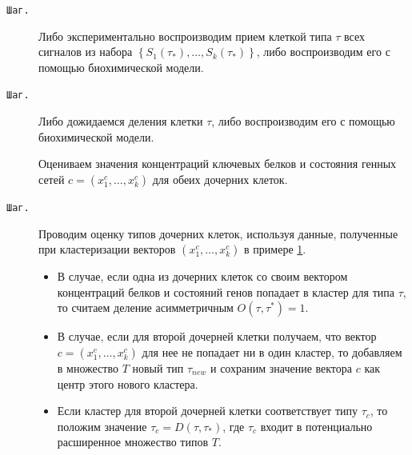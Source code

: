 \begin{description}





\item[\tt Шаг.\!\!]  Либо экспериментально воспроизводим прием клеткой типа $\tau$ всех сигналов из набора $\left\lbrace  S_{1}(\tau_{*}), \dots , S_{k}(\tau_{*}) \right\rbrace $, либо воспроизводим его с помощью биохимической модели.  



\item[\tt Шаг.\!\!]  Либо дожидаемся деления клетки $\tau$, либо воспроизводим его с помощью биохимической модели. 

Оцениваем значения концентраций ключевых белков и состояния генных сетей $c = (x^{c}_{1}, \dots ,x^{c}_{k})$ для обеих дочерних клеток. 



\item[\tt Шаг.\!\!]   Проводим оценку типов дочерних клеток, используя данные, полученные при кластеризации векторов $ (x^{c}_{1}, \dots ,x^{c}_{k})$ в примере \hyperlink{naz:ex:1}{1}.

\begin{itemize}

	\item В случае, если одна из дочерних клеток со своим вектором концентраций белков и состояний генов попадает в кластер для типа $\tau$, то считаем деление асимметричным $O(\tau,\tau^{*}) = 1$.

	\item В случае, если для второй дочерней клетки получаем, что вектор $c = (x^{c}_{1}, \dots ,x^{c}_{k})$ для нее не попадает ни в один кластер, то добавляем в множество $T$ новый тип $\tau_{new}$ и сохраним значение вектора $c$ как центр этого нового кластера.

	\item Если кластер для второй дочерней клетки соответствует типу  $\tau_{c}$, то положим значение $\tau_{c} =D(\tau,\tau_{*}) $, где $\tau_{c}$ входит в потенциально расширенное множество типов $T$.


\end{itemize}



 

\end{description}



